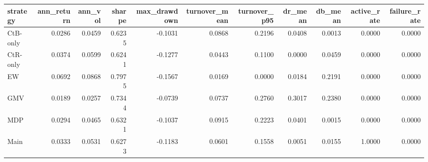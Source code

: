 \begin{tabular}{lrrrrrrrrrr}
\toprule
strategy & ann_return & ann_vol & sharpe & max_drawdown & turnover_mean & turnover_p95 & dr_mean & db_mean & active_rate & failure_rate \\
\midrule
CtB-only & 0.0286 & 0.0459 & 0.6235 & -0.1031 & 0.0868 & 0.2196 & 0.0408 & 0.0013 & 0.0000 & 0.0000 \\
CtR-only & 0.0374 & 0.0599 & 0.6241 & -0.1277 & 0.0443 & 0.1100 & 0.0000 & 0.0459 & 0.0000 & 0.0000 \\
EW & 0.0692 & 0.0868 & 0.7975 & -0.1567 & 0.0169 & 0.0000 & 0.0184 & 0.2191 & 0.0000 & 0.0000 \\
GMV & 0.0189 & 0.0257 & 0.7344 & -0.0739 & 0.0737 & 0.2760 & 0.3017 & 0.2380 & 0.0000 & 0.0000 \\
MDP & 0.0294 & 0.0465 & 0.6321 & -0.1037 & 0.0915 & 0.2223 & 0.0401 & 0.0015 & 0.0000 & 0.0000 \\
Main & 0.0333 & 0.0531 & 0.6273 & -0.1183 & 0.0601 & 0.1558 & 0.0051 & 0.0155 & 1.0000 & 0.0000 \\
\bottomrule
\end{tabular}
